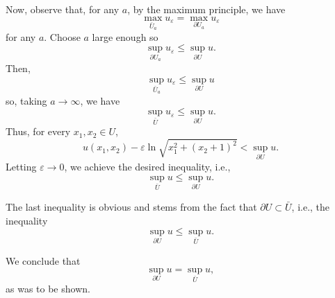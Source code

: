 \begin{solution*}
  Now, observe that, for any \(a\), by the maximum principle, we have
  \[
    \max_{\bar U_a}u_\varepsilon=\max_{\partial U_a}u_\varepsilon
  \]
  for any \(a\). Choose \(a\) large enough so
  \[
    \sup_{\partial U_a}u_\varepsilon\leq
    \sup_{\partial U}u.
  \]
  Then,
  \[
    \sup_{\bar U_a}u_\varepsilon\leq\sup_{\partial U}u
  \]
  so, taking \(a\to\infty\), we have
  \[
    \sup_{\bar U}u_\varepsilon\leq\sup_{\partial U}u.
  \]
  Thus, for every \(x_1,x_2\in U\),
  \[
    u(x_1,x_2)-\varepsilon\ln\sqrt{x_1^2+(x_2+1)^2}<\sup_{\partial U}u.
  \]
  Letting \(\varepsilon\to 0\), we achieve the desired inequality, i.e.,
  \[
    \sup_{\bar U}u\leq\sup_{\partial U}u.
  \]

  The last inequality is obvious and stems from the fact that
  \(\partial U\subset\bar U\), i.e., the inequality
  \[
    \sup_{\partial U}u\leq\sup_{\bar U}u.
  \]

  We conclude that
  \[
    \sup_{\partial U}u=\sup_{\bar U}u,
  \]
  as was to be shown.
\end{solution*}

